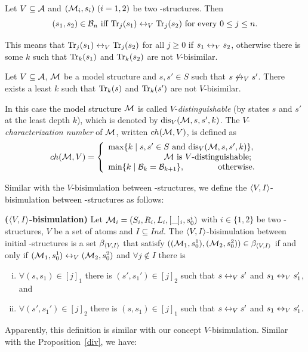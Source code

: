 \documentclass[letterpaper]{article} %
\begin{document}
\begin{proposition}\label{B_to_T}
  Let $V\subseteq\cal A$ and $({\cal M}_i,s_i)~(i=1,2)$ be two \MPK-structures.
  Then
  \[(s_1,s_2)\in{\cal B}_n\mbox{ iff }
  \textrm{Tr}_j(s_1)\leftrightarrow_V\textrm{Tr}_j(s_2)\mbox{ for every $0\le j\le n$}.\]
\end{proposition}
This means that $\textrm{Tr}_j(s_1) \leftrightarrow_V \textrm{Tr}_j(s_2)$ for all $j \geq 0$ if $s_1 \leftrightarrow_V s_2$, otherwise there is some $k$ such that $\textrm{Tr}_k(s_1)$ and $\textrm{Tr}_k(s_2)$ are not $V$-bisimilar.

\begin{proposition}\label{pro:k}
  Let $V\subseteq {\cal A}$, ${\cal M}$ be a model structure and $s,s'\in S$
  such that $s\not\leftrightarrow_V s'$.
  There exists a least  $k$ such that
  $\textrm{Tr}_k(s)$ and $\textrm{Tr}_k(s')$ are not $V$-bisimilar.
\end{proposition}
In this case the  model structure ${\cal M}$ is called $V$-{\em distinguishable} (by
states $s$ and $s'$ at the least depth $k$), which is denoted by $\textrm{dis}_V({\cal M},s,s',k)$.
The $V$-{\em characterization number}
of ${\cal M}$, written $ch({\cal M},V)$, is defined as
\[ch({\cal M},V)=
\left\{
  \begin{array}{ll}
    \max\{k\mid s,s'\in S \text{ and }\textrm{dis}_V({\cal M},s,s',k)\},\\
         \ \ \qquad \qquad \qquad \hbox{${\cal M}$ is $V$-distinguishable;} \\
    \min\{k\mid {\cal B}_{k}={\cal B}_{k+1}\}, \ \ \ \quad \qquad \hbox{otherwise.}
  \end{array}
\right.
\]



Similar with the $V$-bisimulation between \MPK-structures, we define the ${\langle{V,I}\rangle}$-bisimulation between \Ind-structures as follows:
\begin{definition}\label{def:VInd:bisimulation}
\textbf{(${\langle{V,I}\rangle}$-bisimulation)}
Let ${\cal M}_i=(S_i, R_i, L_i, [\_]_i, s_0^i)$ with $i\in \{1, 2\}$ be two \Ind-structures, $V$ be a set of atoms and $I \subseteq Ind$. The ${\langle{V,I}\rangle}$-bisimulation between initial \Ind-structures is a set $\beta_{{\langle{V,I}\rangle}}$ that satisfy $(({\cal M}_1, s_0^1), ({\cal M}_2, s_0^2)) \in \beta_{{\langle{V,I}\rangle}}$  if and only if $({\cal M}_1, s_0^1) \leftrightarrow_V ({\cal M}_2, s_0^2)$ and $\forall j \notin I$ there is
\begin{enumerate}[(i)]
  \item $\forall (s, s_1)\in [j]_1$ there is $(s',s_1')\in [j]_2$ such that $s\leftrightarrow_V s'$ and $s_1 \leftrightarrow_V s_1'$, and
  \item $\forall (s', s_1')\in [j]_2$ there is $(s,s_1)\in [j]_1$ such that $s\leftrightarrow_V s'$ and $s_1 \leftrightarrow_V s_1'$.
\end{enumerate}
\end{definition}
Apparently, this definition is similar with our concept $V$-bisimulation. Similar with the Proposition~\ref{div}, we have:
\end{document}
